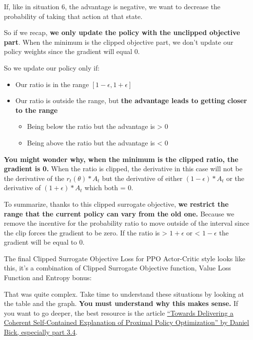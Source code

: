 \documentclass[11pt,a4paper]{article}
\begin{document}
If, like in situation 6, the advantage is negative, we want to decrease the probability of taking that action at that state.

So if we recap, \textbf{we only update the policy with the unclipped objective part}. When the minimum is the clipped objective part, we don't update our policy weights since the gradient will equal 0.

So we update our policy only if:

\begin{itemize}
\tightlist
\item
  Our ratio is in the range \([1 - \epsilon, 1 + \epsilon]\)
\item
  Our ratio is outside the range, but \textbf{the advantage leads to getting closer to the range}

  \begin{itemize}
  \tightlist
  \item
    Being below the ratio but the advantage is \textgreater{} 0
  \item
    Being above the ratio but the advantage is \textless{} 0
  \end{itemize}
\end{itemize}

\textbf{You might wonder why, when the minimum is the clipped ratio, the gradient is 0.} When the ratio is clipped, the derivative in this case will not be the derivative of the \(r_t(\theta) * A_t\) but the derivative of either \((1 - \epsilon)* A_t\) or the derivative of \((1 + \epsilon)* A_t\) which both = 0.

To summarize, thanks to this clipped surrogate objective, \textbf{we restrict the range that the current policy can vary from the old one.} Because we remove the incentive for the probability ratio to move outside of the interval since the clip forces the gradient to be zero. If the ratio is \textgreater{} \(1 + \epsilon\) or \textless{} \(1 - \epsilon\) the gradient will be equal to 0.

The final Clipped Surrogate Objective Loss for PPO Actor-Critic style looks like this, it's a combination of Clipped Surrogate Objective function, Value Loss Function and Entropy bonus:


That was quite complex. Take time to understand these situations by looking at the table and the graph. \textbf{You must understand why this makes sense.} If you want to go deeper, the best resource is the article \href{https://fse.studenttheses.ub.rug.nl/25709/1/mAI_2021_BickD.pdf}{``Towards Delivering a Coherent Self-Contained Explanation of Proximal Policy Optimization'' by Daniel Bick, especially part 3.4}.
\end{document}
